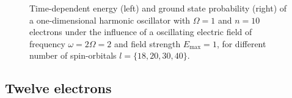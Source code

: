\begin{figure}[!h]
{\begin{minipage}{0.6\textwidth}
    \end{minipage}
    }
    \caption{Time-dependent energy (left) and ground state probability (right)
        of a one-dimensional harmonic oscillator with $\Omega=1$
        and $n=10$ electrons under the influence of a oscillating electric field 
        of frequency $\omega = 2 \Omega = 2$ and field strength $E_\text{max}=1$,
        for different number of spin-orbitals $l=\{18,20,30,40\}$.
    }
    \label{fig:1d_n10_qd}
\end{figure}

\subsection*{Twelve electrons}

\begin{figure}[!h]
    \centering
\end{figure}
